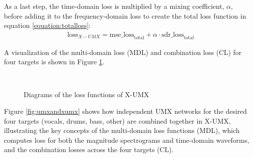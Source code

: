 \documentclass[report.tex]{subfiles}
\begin{document}
As a last step, the time-domain loss is multiplied by a mixing coefficient, $\alpha$, before adding it to the frequency-domain loss to create the total loss function in equation \eqref{equation:totalloss}:
\begin{align}\tag{36}\label{equation:totalloss}
	\nonumber & \text{loss}_{X-UMX} = \text{mse\_loss}_{\text{total}} + \alpha \cdot \text{sdr\_loss}_{\text{total}}
\end{align}

A visualization of the multi-domain loss (MDL) and combination loss (CL) for four targets is shown in Figure \ref{fig:xumxlosses}.

\begin{figure}[ht]
	\centering
	\\
	\caption{Diagrams of the loss functions of X-UMX \parencite[2]{xumx}}
	\label{fig:xumxlosses}
\end{figure}

Figure \ref{fig:umxandxumx} shows how independent UMX networks for the desired four targets (vocals, drums, bass, other) are combined together in X-UMX, illustrating the key concepts of the multi-domain loss functions (MDL), which computes loss for both the magnitude spectrograms and time-domain waveforms, and the combination losses across the four targets (CL).
\end{document}
